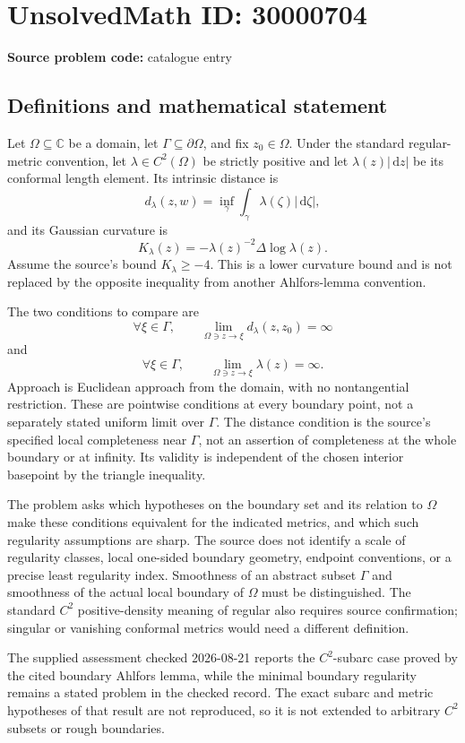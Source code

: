 \documentclass[11pt]{article}
\newcommand{\C}{\mathbb{C}}
\newcommand{\dd}{\,\mathrm{d}}
\begin{document}
\section*{UnsolvedMath ID: 30000704}
\textbf{Source problem code:} catalogue entry
\subsection{Definitions and mathematical statement}
Let \(\Omega\subseteq\C\) be a domain, let \(\Gamma\subseteq\partial\Omega\), and fix \(z_0\in\Omega\). Under the standard regular-metric convention, let \(\lambda\in C^2(\Omega)\) be strictly positive and let \(\lambda(z)|\dd z|\) be its conformal length element. Its intrinsic distance is
\[
d_\lambda(z,w)=\inf_\gamma\int_\gamma\lambda(\zeta)|\dd\zeta|,
\]
and its Gaussian curvature is
\[
K_\lambda(z)=-\lambda(z)^{-2}\Delta\log\lambda(z).
\]
Assume the source's bound \(K_\lambda\geq-4\). This is a lower curvature bound and is not replaced by the opposite inequality from another Ahlfors-lemma convention.

The two conditions to compare are
\[
\forall\xi\in\Gamma,\qquad
\lim_{\Omega\ni z\to\xi}d_\lambda(z,z_0)=\infty
\]
and
\[
\forall\xi\in\Gamma,\qquad
\lim_{\Omega\ni z\to\xi}\lambda(z)=\infty.
\]
Approach is Euclidean approach from the domain, with no nontangential restriction. These are pointwise conditions at every boundary point, not a separately stated uniform limit over \(\Gamma\). The distance condition is the source's specified local completeness near \(\Gamma\), not an assertion of completeness at the whole boundary or at infinity. Its validity is independent of the chosen interior basepoint by the triangle inequality.

The problem asks which hypotheses on the boundary set and its relation to \(\Omega\) make these conditions equivalent for the indicated metrics, and which such regularity assumptions are sharp. The source does not identify a scale of regularity classes, local one-sided boundary geometry, endpoint conventions, or a precise least regularity index. Smoothness of an abstract subset \(\Gamma\) and smoothness of the actual local boundary of \(\Omega\) must be distinguished. The standard \(C^2\) positive-density meaning of regular also requires source confirmation; singular or vanishing conformal metrics would need a different definition.

The supplied assessment checked 2026-08-21 reports the \(C^2\)-subarc case proved by the cited boundary Ahlfors lemma, while the minimal boundary regularity remains a stated problem in the checked record. The exact subarc and metric hypotheses of that result are not reproduced, so it is not extended to arbitrary \(C^2\) subsets or rough boundaries.
\end{document}
